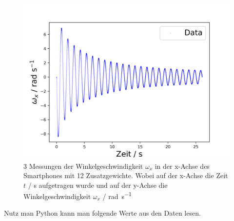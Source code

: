 \documentclass[11pt,ngerman]{scrartcl}
\begin{document}
\begin{figure}[H]
\begin{minipage}[htbp]{\linewidth}
\begin{minipage}[htbp]{.32\linewidth}
            \includegraphics[width=\linewidth]{pics/omega/fit_of_t_wx_mess_nr_12.png}
        \end{minipage}
        \caption[Schwingungsmessungen mit 12 Zusatzgewichte]{3 Messungen der Winkelgeschwindigkeit $\omega_{x}$ in der x-Achse des Smartphones mit 12 Zusatzgewichte.
        Wobei auf der x-Achse die Zeit $t$ / \si{\second} aufgetragen wurde und auf der y-Achse die Winkelgeschwindigkeit $\omega_x$ / \si{\radian\per\second} }
        \label{fig:mit12}
    \end{minipage}
 \end{figure}

Nutz man Python kann man folgende Werte aus den Daten lesen.
\end{document}
